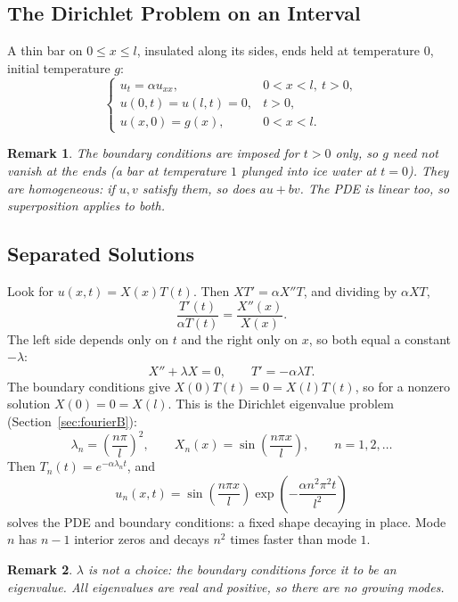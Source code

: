 \documentclass{article}
\newtheorem{remark}{Remark}
\begin{document}
\subsection{The Dirichlet Problem on an Interval}
A thin bar on $0 \leq x \leq l$, insulated along its sides, ends held at temperature $0$, initial temperature $g$:
\begin{equation}\label{eq:heat-dir}
    \begin{cases}
        u_t = \alpha u_{xx}, & 0 < x < l,\ t > 0, \\
        u(0,t) = u(l,t) = 0, & t > 0, \\
        u(x,0) = g(x), & 0 < x < l.
    \end{cases}
\end{equation}
\begin{remark}
    The boundary conditions are imposed for $t > 0$ only, so $g$ need not vanish at the ends (a bar at temperature $1$ plunged into ice water at $t = 0$). They are \emph{homogeneous}: if $u, v$ satisfy them, so does $au + bv$. The PDE is linear too, so superposition applies to both.
\end{remark}

\subsection{Separated Solutions}
Look for $u(x,t) = X(x)T(t)$. Then $XT' = \alpha X''T$, and dividing by $\alpha XT$,
\begin{equation}
    \frac{T'(t)}{\alpha T(t)} = \frac{X''(x)}{X(x)}.
\end{equation}
The left side depends only on $t$ and the right only on $x$, so both equal a constant $-\lambda$:
\begin{equation}
    X'' + \lambda X = 0, \qquad T' = -\alpha\lambda T.
\end{equation}
The boundary conditions give $X(0)T(t) = 0 = X(l)T(t)$, so for a nonzero solution $X(0) = 0 = X(l)$. This is the Dirichlet eigenvalue problem (Section~\ref{sec:fourierB}):
\begin{equation}
    \lambda_n = \left(\frac{n\pi}{l}\right)^2, \qquad X_n(x) = \sin\left(\frac{n\pi x}{l}\right), \qquad n = 1, 2, \dots
\end{equation}
Then $T_n(t) = e^{-\alpha\lambda_nt}$, and
\begin{equation}
    u_n(x,t) = \sin\left(\frac{n\pi x}{l}\right)\exp\left(-\frac{\alpha n^2\pi^2t}{l^2}\right)
\end{equation}
solves the PDE and boundary conditions: a fixed shape decaying in place. Mode $n$ has $n - 1$ interior zeros and decays $n^2$ times faster than mode $1$.
\begin{remark}
    $\lambda$ is not a choice: the boundary conditions force it to be an eigenvalue. All eigenvalues are real and positive, so there are no growing modes.
\end{remark}
\end{document}
